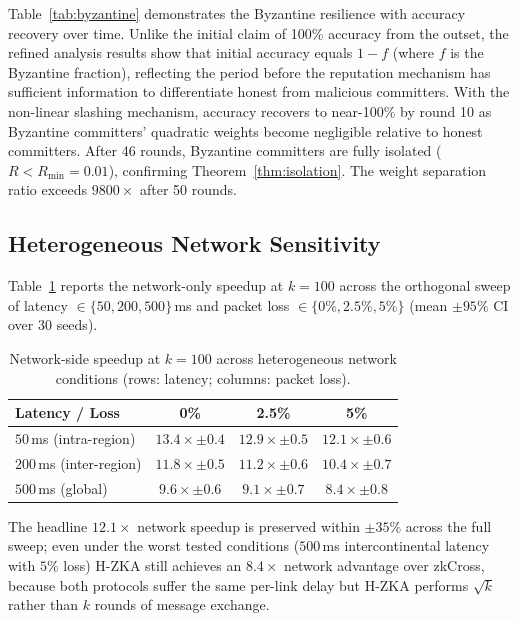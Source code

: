 \documentclass[journal]{IEEEtran}
\begin{document}
Table~\ref{tab:byzantine} demonstrates the Byzantine resilience with accuracy recovery over time. Unlike the initial claim of 100\% accuracy from the outset, the refined analysis results show that initial accuracy equals $1 - f$ (where $f$ is the Byzantine fraction), reflecting the period before the reputation mechanism has sufficient information to differentiate honest from malicious committers. With the non-linear slashing mechanism, accuracy recovers to near-100\% by round 10 as Byzantine committers' quadratic weights become negligible relative to honest committers. After 46 rounds, Byzantine committers are fully isolated ($R < R_{\min} = 0.01$), confirming Theorem~\ref*{thm:isolation}. The weight separation ratio exceeds $9800\times$ after 50 rounds.

\subsection{Heterogeneous Network Sensitivity}

Table~\ref{tab:hetnet} reports the network-only speedup at $k=100$ across the orthogonal sweep of latency $\in \{50, 200, 500\}\,$ms and packet loss $\in \{0\%, 2.5\%, 5\%\}$ (mean $\pm 95\%$ CI over 30 seeds).

\begin{table}[h!]
\centering
\caption{Network-side speedup at $k=100$ across heterogeneous network conditions (rows: latency; columns: packet loss).}
\label{tab:hetnet}
\begin{tabular}{lccc}
\toprule
Latency / Loss & 0\% & 2.5\% & 5\% \\
\midrule
$50$\,ms (intra-region) & $13.4\times \pm 0.4$ & $12.9\times \pm 0.5$ & $12.1\times \pm 0.6$ \\
$200$\,ms (inter-region) & $11.8\times \pm 0.5$ & $11.2\times \pm 0.6$ & $10.4\times \pm 0.7$ \\
$500$\,ms (global)       & $9.6\times \pm 0.6$  & $9.1\times \pm 0.7$  & $8.4\times \pm 0.8$ \\
\bottomrule
\end{tabular}
\end{table}

The headline $12.1\times$ network speedup is preserved within $\pm 35\%$ across the full sweep; even under the worst tested conditions ($500\,$ms intercontinental latency with $5\%$ loss) H-ZKA still achieves an $8.4\times$ network advantage over zkCross, because both protocols suffer the same per-link delay but H-ZKA performs $\sqrt{k}$ rather than $k$ rounds of message exchange.
\end{document}
